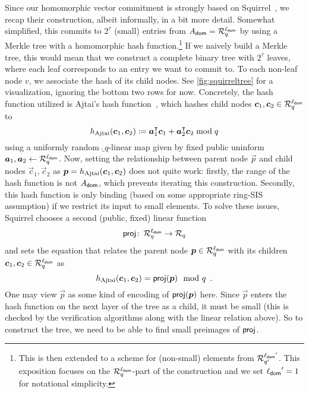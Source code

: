 Since our homomorphic vector commitment is strongly based on Squirrel~\cite{CCS:FleSimZha22}, we recap their construction, albeit informally, in a bit more detail.
Somewhat simplified, this commits to $2^\tau$ (small) entries from $A_{\mathsf{dom}} = \mathcal{R}_q^{\ell_{\mathsf{dom}}}$ by using a Merkle tree with a homomorphic hash function.\footnote{This is then extended to a scheme for (non-small) elements from $\mathcal{R}_{q'}^{{\ell_{\mathsf{dom}}}'}$. This exposition focuses on the $\mathcal{R}_q^{{\ell_{\mathsf{dom}}}}$-part of the construction and we set ${\ell_{\mathsf{dom}}}'=1$ for notational simplicity.}
If we naively build a Merkle tree, this would mean that we construct a complete binary tree with $2^\tau$ leaves, where each leaf corresponds to an entry we want to commit to.
To each non-leaf node $v$, we associate the hash of its child nodes.
See \autoref{fig:squirreltree} for a visualization, ignoring the bottom two rows for now.
Concretely, the hash function utilized is Ajtai's hash function~\cite{ICALP:Ajtai99}, which hashes child nodes $\boldsymbol{c}_1, \boldsymbol{c}_2\in\mathcal{R}_q^{\ell_{\mathsf{dom}}}$ to
\[
h_\mathrm{Ajtai}(\boldsymbol{c}_1,\boldsymbol{c}_2) \coloneqq \boldsymbol{a}_1^\intercal \boldsymbol{c}_1 + \boldsymbol{a}_2^\intercal \boldsymbol{c}_2 \bmod q
\]
using a uniformly random $\ring_q$-linear map given by fixed public uninform $\boldsymbol{a}_1,\boldsymbol{a}_2\gets \mathcal{R}_q^{\ell_{\mathsf{dom}}}$.
Now, setting the relationship between parent node $\vec{p}$ and child nodes $\vec{c}_1, \vec{c}_2$ as $\boldsymbol{p}=h_\mathrm{Ajtai}(\boldsymbol{c}_1,\boldsymbol{c}_2)$ does not quite work: firstly, the range of the hash function is not $A_{\mathsf{dom}}$, which prevents iterating this construction.
Secondly, this hash function is only binding (based on some appropriate ring-SIS assumption) if we restrict its input to small elements.
To solve these issues, Squirrel chooses a second (public, fixed) linear function
\[
\mathsf{proj}\colon\,\mathcal{R}_q^{\ell_{\mathsf{dom}}} \to \mathcal{R}_q
\]
and sets the equation that relates the parent node $\boldsymbol{p}\in\mathcal{R}_q^{\ell_{\mathsf{dom}}}$ with its children $\boldsymbol{c}_1,\boldsymbol{c}_2\in\mathcal{R}_q^{\ell_{\mathsf{dom}}}$ as
\begin{equation}
h_\mathrm{Ajtai}(\boldsymbol{c}_1,\boldsymbol{c}_2) = \mathsf{proj}(\boldsymbol{p}) \mod q\enspace. \label{eq:treerelation}
\end{equation}
%
One may view $\vec{p}$ as some kind of encoding of $\mathsf{proj}(\boldsymbol{p})$ here. Since $\vec{p}$ enters the hash function on the next layer of the tree as a child, it must be small (this is checked by the verification algorithms along with the linear relation above).
So to construct the tree, we need to be able to find small preimages of $\mathsf{proj}$.
